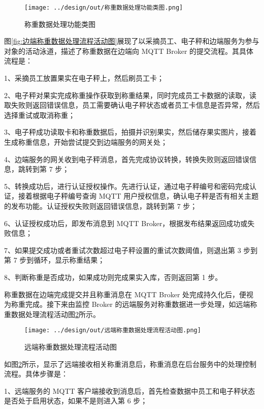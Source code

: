 \begin{figure}[H]
    \centering
    \texttt{[image: ../design/out/称重数据处理功能类图.png]}
    \caption{称重数据处理功能类图}
    \label{fig:称重数据处理功能类图}
\end{figure}

图\ref{fig:边端称重数据处理流程活动图}展现了以采摘员工、电子秤和边端服务为参与对象的活动泳道，描述了称重数据在边端向 MQTT Broker 的提交流程。其具体流程是：

1、采摘员工放置果实在电子秤上，然后刷员工卡；

2、电子秤对果实完成称重操作获取到称重结果，同时完成员工卡数据的读取，读取失败则返回错误信息，员工需要确认电子秤状态或者员工卡信息是否异常，然后选择重试或取消称重；

3、电子秤成功读取卡和称重数据后，拍摄并识别果实，然后储存果实图片，接着生成称重信息，开始尝试提交到边端服务的网关处；

4、边端服务的网关收到电子秤消息，首先完成协议转换，转换失败则返回错误信息，跳转到第 7 步；

5、转换成功后，进行认证授权操作。先进行认证，通过电子秤编号和密码完成认证，接着根据电子秤编号查询 MQTT 用户授权信息，确认电子秤是否有相关主题的发布功能。认证授权失败则返回错误信息，跳转到第 7 步；

6、认证授权成功后，即发布消息到 MQTT Broker，根据发布结果返回成功或失败信息；

7、如果提交成功或者重试次数超过电子秤设置的重试次数阈值，则退出第 3 步到第 7 步到循环，显示称重结果；

8、判断称重是否成功，如果成功则完成果实入库，否则返回第 1 步。

称重数据在边端完成提交并且称重消息在 MQTT Broker 处完成持久化后，便视为称重完成。接下来由监控 Broker 的远端服务对称重数据进一步处理，如远端称重数据处理流程活动图\ref{fig:远端称重数据处理流程活动图}所示。

\begin{figure}[H]
    \centering
    \texttt{[image: ../design/out/远端称重数据处理流程活动图.png]}
    \caption{远端称重数据处理流程活动图}
    \label{fig:远端称重数据处理流程活动图}
\end{figure}

如图\ref{fig:远端称重数据处理流程活动图}所示，显示了远端接收相关称重消息后，称重消息在后台服务中的处理控制流程。具体步骤是：

1、远端服务的 MQTT 客户端接收到消息后，首先检查数据中员工和电子秤状态是否处于启用状态，如果不是则进入第 6 步；

